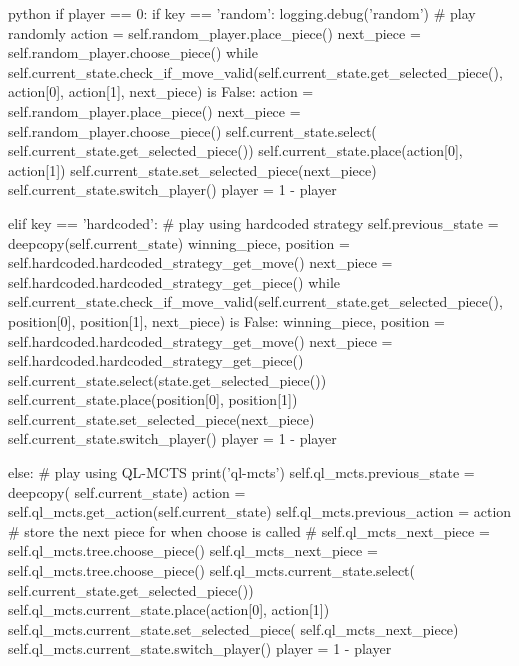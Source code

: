 \begin{mintedbox}{python}
                if player == 0:
                    if key == 'random':
                        logging.debug('random')
                        # play randomly
                        action = self.random_player.place_piece()
                        next_piece = self.random_player.choose_piece()
                        while self.current_state.check_if_move_valid(self.current_state.get_selected_piece(), action[0], action[1], next_piece) is False:
                            action = self.random_player.place_piece()
                            next_piece = self.random_player.choose_piece()
                        self.current_state.select(
                            self.current_state.get_selected_piece())
                        self.current_state.place(action[0], action[1])
                        self.current_state.set_selected_piece(next_piece)
                        self.current_state.switch_player()
                        player = 1 - player

                    elif key == 'hardcoded':
                        # play using hardcoded strategy
                        self.previous_state = deepcopy(self.current_state)
                        winning_piece, position = self.hardcoded.hardcoded_strategy_get_move()
                        next_piece = self.hardcoded.hardcoded_strategy_get_piece()
                        while self.current_state.check_if_move_valid(self.current_state.get_selected_piece(), position[0], position[1], next_piece) is False:
                            winning_piece, position = self.hardcoded.hardcoded_strategy_get_move()
                            next_piece = self.hardcoded.hardcoded_strategy_get_piece()
                        self.current_state.select(state.get_selected_piece())
                        self.current_state.place(position[0], position[1])
                        self.current_state.set_selected_piece(next_piece)
                        self.current_state.switch_player()
                        player = 1 - player

                    else:
                        # play using QL-MCTS
                        print('ql-mcts')
                        self.ql_mcts.previous_state = deepcopy(
                            self.current_state)
                        action = self.ql_mcts.get_action(self.current_state)
                        self.ql_mcts.previous_action = action
                        # store the next piece for when choose is called
                        # self.ql_mcts_next_piece = self.ql_mcts.tree.choose_piece()
                        self.ql_mcts_next_piece = self.ql_mcts.tree.choose_piece()
                        self.ql_mcts.current_state.select(
                            self.current_state.get_selected_piece())
                        self.ql_mcts.current_state.place(action[0], action[1])
                        self.ql_mcts.current_state.set_selected_piece(
                            self.ql_mcts_next_piece)
                        self.ql_mcts.current_state.switch_player()
                        player = 1 - player


\end{mintedbox}

